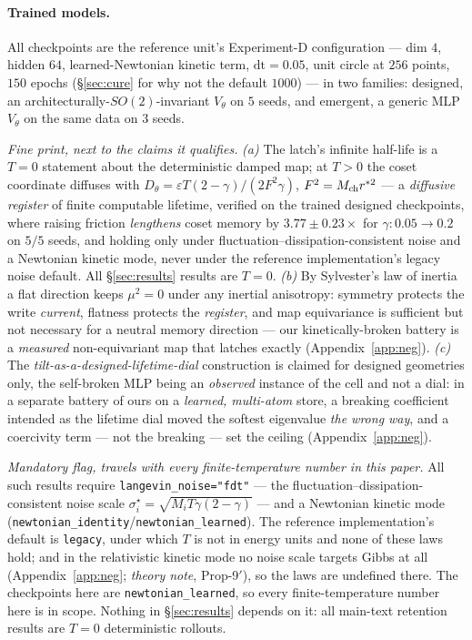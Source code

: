\documentclass{article}
\begin{document}
\paragraph{Trained models.} All checkpoints are the reference unit's Experiment-D configuration --- dim $4$, hidden $64$, learned-Newtonian kinetic term, $\mathrm{dt}=0.05$, unit circle at $256$ points, $150$ epochs (\S\ref{sec:cure} for why not the default $1000$) --- in two families: designed, an architecturally-$SO(2)$-invariant $V_\theta$ on $5$ seeds, and emergent, a generic MLP $V_\theta$ on the same data on $3$ seeds.

{
\emph{Fine print, next to the claims it qualifies.} \emph{(a)} The latch's infinite half-life is a $T=0$ statement about the deterministic damped map; at $T>0$ the coset coordinate diffuses with $D_\theta=\varepsilon T(2-\gamma)/(2F^2\gamma)$, $F^2=M_{\rm ch}r^{*2}$ --- a \emph{diffusive register} of finite computable lifetime, verified on the trained designed checkpoints, where raising friction \emph{lengthens} coset memory by $3.77\pm0.23\times$ for $\gamma:0.05\to0.2$ on $5/5$ seeds, and holding only under fluctuation--dissipation-consistent noise and a Newtonian kinetic mode, never under the reference implementation's legacy noise default. All \S\ref{sec:results} results are $T=0$. \emph{(b)} By Sylvester's law of inertia a flat direction keeps $\mu^2=0$ under any inertial anisotropy: symmetry protects the write \emph{current}, flatness protects the \emph{register}, and map equivariance is sufficient but not necessary for a neutral memory direction --- our kinetically-broken battery is a \emph{measured} non-equivariant map that latches exactly (Appendix~\ref{app:neg}). \emph{(c)} The \emph{tilt-as-a-designed-lifetime-dial} construction is claimed for designed geometries only, the self-broken MLP being an \emph{observed} instance of the cell and not a dial: in a separate battery of ours on a \emph{learned, multi-atom} store, a breaking coefficient intended as the lifetime dial moved the softest eigenvalue \emph{the wrong way}, and a coercivity term --- not the breaking --- set the ceiling (Appendix~\ref{app:neg}).

\emph{Mandatory flag, travels with every finite-temperature number in this paper.} All such results require \texttt{langevin\_noise="fdt"} --- the fluctuation--dissipation-consistent noise scale $\sigma^\star_i=\sqrt{M_iT\gamma(2-\gamma)}$ --- and a Newtonian kinetic mode (\texttt{newtonian\_identity}/\texttt{newtonian\_learned}). The reference implementation's default is \texttt{legacy}, under which $T$ is not in energy units and none of these laws hold; and in the relativistic kinetic mode no noise scale targets Gibbs at all (Appendix~\ref{app:neg}; \emph{theory note}, Prop-9$'$), so the laws are undefined there. The checkpoints here are \texttt{newtonian\_learned}, so every finite-temperature number here is in scope. Nothing in \S\ref{sec:results} depends on it: all main-text retention results are $T=0$ deterministic rollouts.
\par}
\end{document}

